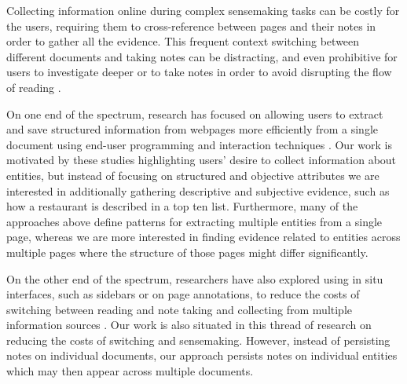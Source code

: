 Collecting information online during complex sensemaking tasks can be costly for the users, requiring them to cross-reference between pages and their notes in order to gather all the evidence. This frequent context switching between different documents and taking notes can be distracting, and even prohibitive for users to investigate deeper or to take notes in order to avoid disrupting the flow of reading \cite{o1996towards,marshall1999introducing,tashman2011liquidtext,bianchi2015designing}.

On one end of the spectrum, research has focused on allowing users to extract and save structured information from webpages more efficiently from a single document using end-user programming \cite{thresher,huynh2005piggy,dontcheva2006collecting,dontcheva2007relations} and interaction techniques \cite{bier2006entity,stylos2004citrine}. Our work is motivated by these studies highlighting users' desire to collect information about entities, but instead of focusing on structured and objective attributes we are interested in additionally gathering descriptive and subjective evidence, such as how a restaurant is described in a top ten list. Furthermore, many of the approaches above define patterns for extracting multiple entities from a single page, whereas we are more interested in finding evidence related to entities across multiple pages where the structure of those pages might differ significantly.

On the other end of the spectrum, researchers have also explored using in situ interfaces, such as sidebars or on page annotations, to reduce the costs of switching between reading and note taking and collecting from multiple information sources \cite{romat2019spaceink,tashman2011liquidtext,notetoself,van2011finders,schraefel2002hunter}. Our work is also situated in this thread of research on reducing the costs of switching and sensemaking. However, instead of persisting notes on individual documents, our approach persists notes on individual entities which may then appear across multiple documents. 



